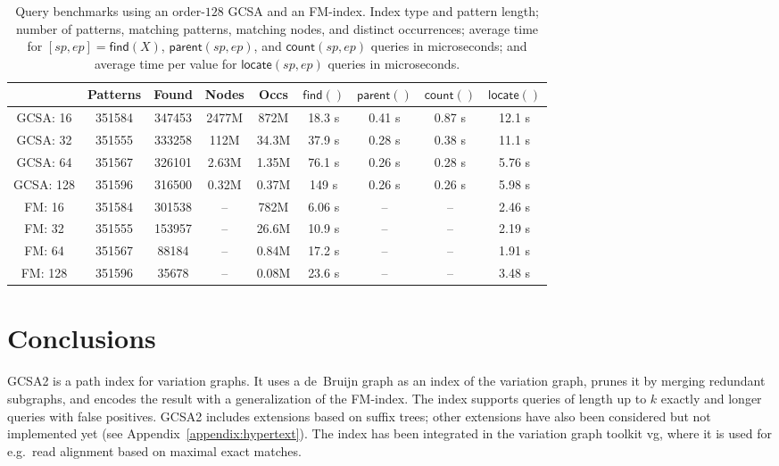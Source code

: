 \documentclass[a4paper,UKenglish]{lipics-v2016}
\newcommand{\find}{\ensuremath{\mathsf{find}}}
\newcommand{\locate}{\ensuremath{\mathsf{locate}}}
\newcommand{\parent}{\ensuremath{\mathsf{parent}}}
\newcommand{\countq}{\ensuremath{\mathsf{count}}}
\newcommand{\orderk}[1]{order\nobreakdash-$#1$}
\begin{document}
\begin{table}[t!]
\begin{center}
\caption{Query benchmarks using an \orderk{128} GCSA and an FM\nobreakdash-index. Index type and pattern length; number of patterns, matching patterns, matching nodes, and distinct occurrences; average time for $[sp, ep] = \find(X)$, $\parent(sp, ep)$, and $\countq(sp, ep)$ queries in microseconds; and average time per value for $\locate(sp, ep)$ queries in microseconds.}\label{table:benchmark}
\begin{tabular}{c|cccc|cccc}
\hline
 & \textbf{Patterns} & \textbf{Found} & \textbf{Nodes} & \textbf{Occs} & $\find()$ & $\parent()$ & $\countq()$ & $\locate()$ \\
\hline
GCSA:  16 & 351584 & 347453 & 2477M &  872M & 18.3 \textmu{}s & 0.41 \textmu{}s & 0.87 \textmu{}s & 12.1 \textmu{}s \\
GCSA:  32 & 351555 & 333258 &  112M & 34.3M & 37.9 \textmu{}s & 0.28 \textmu{}s & 0.38 \textmu{}s & 11.1 \textmu{}s \\
GCSA:  64 & 351567 & 326101 & 2.63M & 1.35M & 76.1 \textmu{}s & 0.26 \textmu{}s & 0.28 \textmu{}s & 5.76 \textmu{}s \\
GCSA: 128 & 351596 & 316500 & 0.32M & 0.37M &  149 \textmu{}s & 0.26 \textmu{}s & 0.26 \textmu{}s & 5.98 \textmu{}s \\
\hline
FM:    16 & 351584 & 301538 &    -- &  782M & 6.06 \textmu{}s &              -- &              -- & 2.46 \textmu{}s \\
FM:    32 & 351555 & 153957 &    -- & 26.6M & 10.9 \textmu{}s &              -- &              -- & 2.19 \textmu{}s \\
FM:    64 & 351567 &  88184 &    -- & 0.84M & 17.2 \textmu{}s &              -- &              -- & 1.91 \textmu{}s \\
FM:   128 & 351596 &  35678 &    -- & 0.08M & 23.6 \textmu{}s &              -- &              -- & 3.48 \textmu{}s \\
\hline
\end{tabular}
\end{center}
\end{table}


\section{Conclusions}

GCSA2 is a path index for variation graphs. It uses a de~Bruijn graph as an index of the variation graph, prunes it by merging redundant subgraphs, and encodes the result with a generalization of the FM\nobreakdash-index. The index supports queries of length up to $k$ exactly and longer queries with false positives. GCSA2 includes extensions based on suffix trees; other extensions have also been considered but not implemented yet (see Appendix~\ref{appendix:hypertext}). The index has been integrated in the variation graph toolkit vg, where it is used for e.g.~read alignment based on maximal exact matches.
\end{document}
